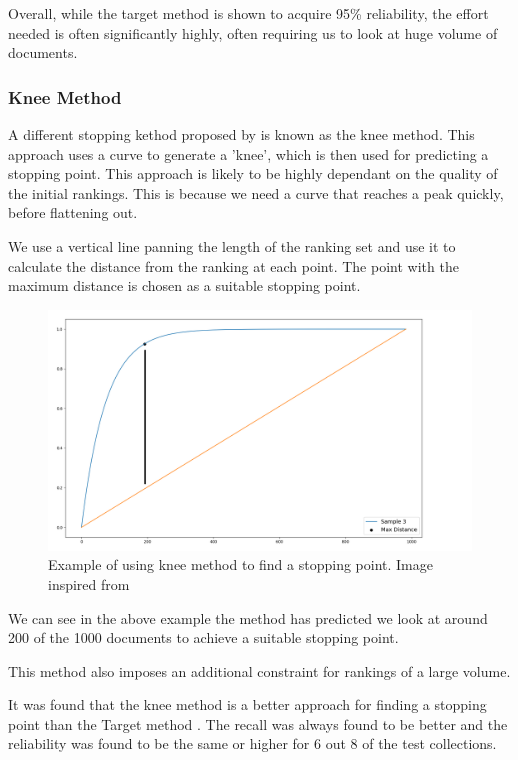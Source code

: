 Overall, while the target method is shown to acquire 95\% reliability, the effort needed is often significantly highly, often requiring us to look at huge volume of documents.

\subsubsection{Knee Method}

A different stopping kethod proposed by \cite{Satopa11} is known as the knee method. This approach uses a curve to generate a 'knee', which is then used for predicting a stopping point. This approach is likely to be highly dependant on the quality of the initial rankings. This is because we need a curve that reaches a peak quickly, before flattening out.

We use a vertical line panning the length of the ranking set and use it to calculate the distance from the ranking at each point. The point with the maximum distance is chosen as a suitable stopping point.

\begin{figure}[H]
\center
\includegraphics[width=13cm]{figures/knee.png}
\caption{Example of using knee method to find a stopping point. Image inspired from \cite{Satopa11}}
\end{figure}

We can see in the above example the method has predicted we look at around 200 of the 1000 documents to achieve a suitable stopping point.

This method also imposes an additional constraint for rankings of a large volume. 

It was found that the knee method is a better approach for finding a stopping point than the Target method \cite{Cormack2016}. The recall was always found to be better and the reliability was found to be the same or higher for 6 out 8 of the test collections.




